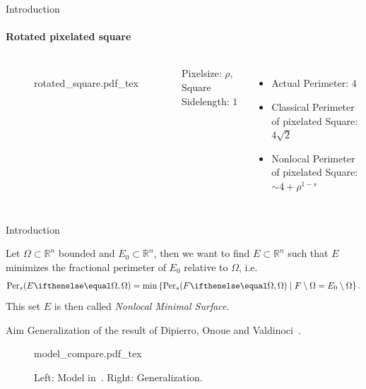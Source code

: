 \documentclass[9pt]{beamer}
\begin{document}
\begin{frame}{Introduction}
  \framesubtitle{Rotated pixelated square}
 \begin{columns}
  \begin{figure}[ht]
    \def\svgwidth{\textwidth}
    {rotated_square.pdf_tex}
   \label{fig:004}
  \end{figure}
    Pixelsize: \( \rho \), Square Sidelength: \( 1 \) \\ 
    \begin{itemize}
      \item<2-> Actual Perimeter: \( 4 \) \\
      \item<3-> Classical Perimeter of pixelated Square: \( 4 \sqrt{2} \) \\ 
      \item<4-> Nonlocal Perimeter of pixelated Square: \( \sim 4 + \rho ^{1-s} \) \\
    \end{itemize}
  \end{columns} 
\end{frame}

\begin{frame}{Introduction}
  \begin{definition}
  \label{def:004}
    	Let \( \Omega \subset \mathbb{R}^n \) bounded and \( E_0 \subset \mathbb{R}^n \), then we want to
	find \( E \subset \mathbb{R}^n \) such that \( E \) minimizes the fractional perimeter of \( E_0 \)
	relative to \( \Omega \), i.e.
	\begin{gather*}
		\Per{s}{E}{\Omega} = \min \left\{\Per{s}{F}{\Omega} \mid F \setminus \Omega = E_0 \setminus \Omega \right\}.
	\end{gather*}
  This set \( E \) is then called \emph{Nonlocal Minimal Surface}.
  \end{definition}
\end{frame}

\begin{frame}{Aim}
  Generalization of the result of Dipierro, Onoue and Valdinoci~\cite{dipierro2020disconnectedness}.
  \begin{figure}[ht]
   \centering
    {model_compare.pdf_tex}
   \caption{Left: Model in~\cite{dipierro2020disconnectedness}. Right: Generalization.}
   \label{fig:001}
  \end{figure} 
\end{frame}
\end{document}
